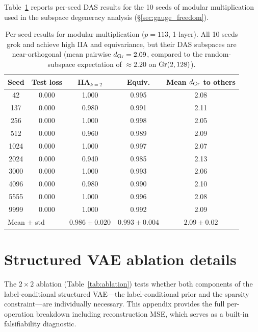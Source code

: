 Table~\ref{tab:seed_data} reports per-seed DAS results for the 10 seeds
of modular multiplication used in the subspace degeneracy analysis
(\S\ref{sec:gauge_freedom}).

\vspace{1em}
\begin{table}[H]
\centering
\small
\begin{tabular}{ccccc}
\toprule
\textbf{Seed} & \textbf{Test loss} & \textbf{IIA}$_{k{=}2}$ &
\textbf{Equiv.} & \textbf{Mean $d_{\mathrm{Gr}}$ to others} \\
\midrule
42   & 0.000 & 1.000 & 0.995 & 2.08 \\
137  & 0.000 & 0.980 & 0.991 & 2.11 \\
256  & 0.000 & 1.000 & 0.998 & 2.05 \\
512  & 0.000 & 0.960 & 0.989 & 2.09 \\
1024 & 0.000 & 1.000 & 0.997 & 2.07 \\
2024 & 0.000 & 0.940 & 0.985 & 2.13 \\
3000 & 0.000 & 1.000 & 0.993 & 2.06 \\
4096 & 0.000 & 0.980 & 0.990 & 2.10 \\
5555 & 0.000 & 1.000 & 0.996 & 2.08 \\
9999 & 0.000 & 1.000 & 0.992 & 2.09 \\
\midrule
\multicolumn{2}{l}{Mean $\pm$ std} & $0.986 \pm 0.020$ & $0.993 \pm 0.004$ &
$2.09 \pm 0.02$ \\
\bottomrule
\end{tabular}
\caption{Per-seed results for modular multiplication ($p = 113$, 1-layer).
All 10 seeds grok and achieve high IIA and equivariance, but their DAS
subspaces are near-orthogonal (mean pairwise $d_{\mathrm{Gr}} = 2.09$, compared to
the random-subspace expectation of $\approx 2.20$ on $\mathrm{Gr}(2, 128)$).}
\label{tab:seed_data}
\end{table}


\section{Structured VAE ablation details}
\label{app:ablation}

The $2 \times 2$ ablation (Table~\ref{tab:ablation}) tests whether both
components of the label-conditional structured VAE---the label-conditional prior and the
sparsity constraint---are individually necessary. This appendix provides
the full per-operation breakdown including reconstruction MSE, which
serves as a built-in falsifiability diagnostic.

